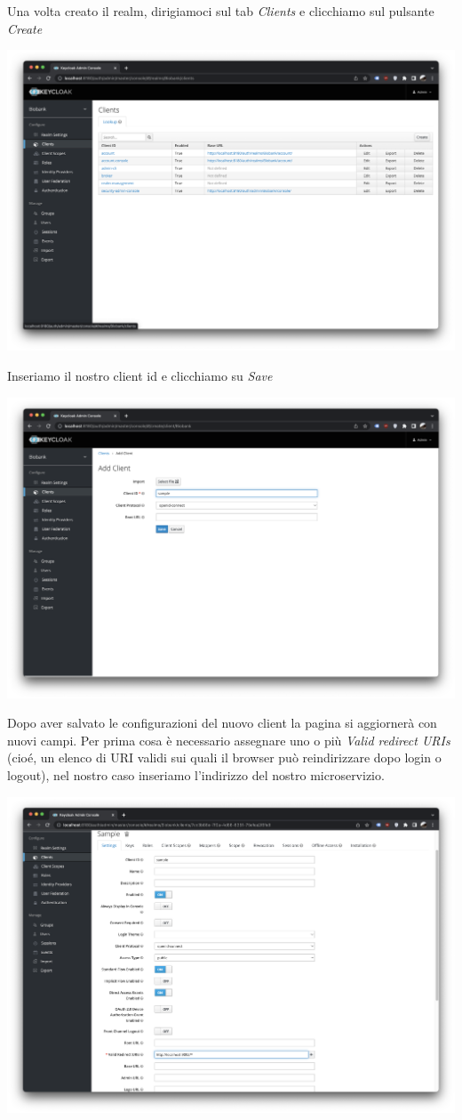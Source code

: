 \documentclass{article}
\begin{document}
Una volta creato il realm, dirigiamoci sul tab \textit{Clients} e clicchiamo sul pulsante \textit{Create}

\begin{center}
    \includegraphics[width=0.80\linewidth]{keycloak_05.png}
\end{center}

Inseriamo il nostro client id e clicchiamo su \textit{Save}

\begin{center}
    \includegraphics[width=0.80\linewidth]{keycloak_06.png}
\end{center}

Dopo aver salvato le configurazioni del nuovo client la pagina si aggiornerà con nuovi campi. Per prima cosa è necessario
assegnare uno o più \textit{Valid redirect URIs} (cioé, un elenco di URI validi sui quali il browser può reindirizzare dopo login o logout), nel nostro caso inseriamo l'indirizzo del nostro microservizio.

\begin{center}
    \includegraphics[width=0.80\linewidth]{keycloak_07.png}
\end{center}
\end{document}

